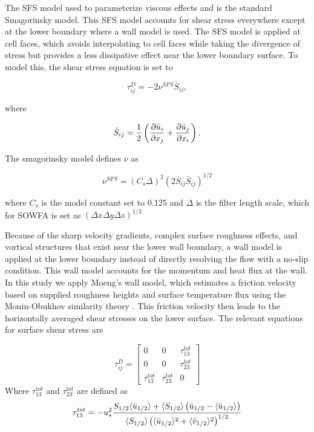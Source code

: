 The SFS model used to parameterize viscous effects and is the standard Smagorinsky model.  This SFS model accounts for shear stress everywhere except at the lower boundary where a wall model is used.  The SFS model is applied at cell faces, which avoids interpolating to cell faces while taking the divergence of stress but provides a less dissipative effect near the lower boundary surface.  To model this, the shear stress equation is set to

\begin{equation}
   \label{eq:smagorinsky}
   \tau^D_{ij} = -2 \nu^{SFS} \bar{S}_{ij},
\end{equation}

where

\begin{equation}
   \bar{S}_{ij} = \frac{1}{2} \left( \frac{\partial \bar{u}_i}{\partial x_j} + \frac{\partial \bar{u}_j}{\partial x_i} \right).
\end{equation}

The smagorinsky model defines $\nu$ as

\begin{equation}
   \nu^{SFS} = (C_s \Delta)^2(2\bar{S}_{ij}\bar{S}_{ij})^{1/2}
\end{equation}

where $C_s$ is the model constant set to 0.125 and $\Delta$ is the filter length scale, which for SOWFA is set as $(\Delta x \Delta y \Delta z)^{1/3}$

Because of the sharp velocity gradients, complex surface roughness effects, and vortical structures that exist near the lower wall boundary, a wall model is applied at the lower boundary instead of directly resolving the flow with a no-slip condition.  This wall model accounts for the momentum and heat flux at the wall.  In this study we apply Moeng's wall model, which estimates a friction velocity based on supplied roughness heights and surface temperature flux using the Monin-Obukhov similarity theory \cite{moeng_large-eddy-simulation_1984}.  This friction velocity then leads to the horizontally averaged shear stresses on the lower surface.  The relevant equations for surface shear stress are 

\begin{equation}
   \label{wall model}
   \tau^D_{ij}=\begin{bmatrix} 0 & 0 & \tau^{tot}_{13} \\ 0 & 0 & \tau^{tot}_{23} \\ \tau^{tot}_{13} & \tau^{tot}_{23} &0 \end{bmatrix}
\end{equation}
Where $\tau^{tot}_{13}$ and $ \tau^{tot}_{23}$ are defined as
\begin{equation}
   \label{tau13}
   \tau^{tot}_{13}=
-u^2_*\frac{S_{1/2}\langle \bar{u}_{1/2}\rangle+\langle S_{1/2}\rangle\left( \bar{u}_{1/2}-\langle\bar{u}_{1/2}\rangle\right) }
{\langle S_{1/2}\rangle\left( \langle\bar{u}_{1/2}\rangle^2+\langle \bar{v}_{1/2}\rangle^2\right)^{1/2} }
\end{equation}

